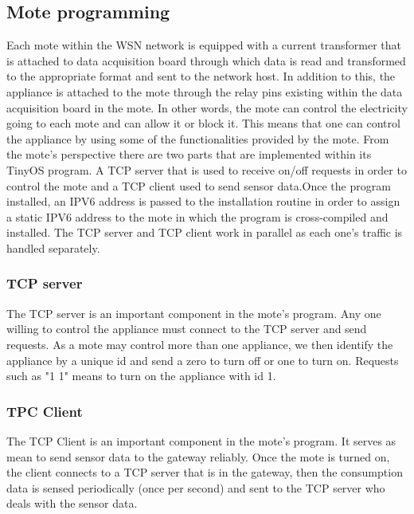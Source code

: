 \documentclass[conference]{IEEEtran}
\begin{document}
\subsection{Mote programming}
Each mote within the WSN network is equipped with a current transformer that is attached to data acquisition board through which data is read and transformed to the appropriate format and sent to the network host. In addition to this, the appliance is attached to the mote through the relay pins existing within the data acquisition board in the mote. In other words, the mote can control the electricity going to each mote and can allow it or block it. This means that one can control the appliance by using some of the functionalities provided by the mote. From the mote's perspective there are two parts that are implemented within its TinyOS program. A TCP server that is used to receive on/off requests in order to control the mote and a TCP client used to send sensor data.Once the program installed, an IPV6 address is passed to the installation routine in order to assign a static IPV6 address to the mote in which the program is cross-compiled and installed. The TCP server and TCP client work in parallel as each one's traffic is handled separately.

\subsubsection{TCP server}
The TCP server is an important component in the mote's program. Any one willing to control the appliance must connect to the TCP server and send requests. As a mote may control more than one appliance, we then identify the appliance by a unique id and send a zero to turn off or one to turn on. Requests such as "1 1" means to turn on the appliance with id 1.
\subsubsection{TPC Client}
The TCP Client is an important component in the mote's program. It serves as mean to send sensor data to the gateway reliably. Once the mote is turned on, the client connects to a TCP server that is in the gateway, then the consumption data is sensed periodically (once per second) and sent to the TCP server who deals with the sensor data.
\end{document}
